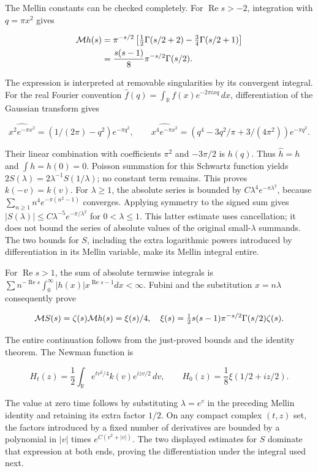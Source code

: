 The Mellin constants can be checked completely. For \(\operatorname{Re}s>-2\), integration with \(q=\pi x^2\) gives

\[
\begin{aligned}
{\cal M}h(s)
&=\pi^{-s/2}\left[\tfrac12\Gamma(s/2+2)-\tfrac34\Gamma(s/2+1)\right]\\
&=\frac{s(s-1)}8\pi^{-s/2}\Gamma(s/2).
\end{aligned}
\]

The expression is interpreted at removable singularities by its convergent integral. For the real Fourier convention \(\widehat f(q)=\int_{\mathbb R}f(x)e^{-2\pi ixq}\,dx\), differentiation of the Gaussian transform gives

\[
\widehat{x^2e^{-\pi x^2}}=(1/(2\pi)-q^2)e^{-\pi q^2},\qquad
\widehat{x^4e^{-\pi x^2}}=(q^4-3q^2/\pi+3/(4\pi^2))e^{-\pi q^2}.
\]

Their linear combination with coefficients \(\pi^2\) and \(-3\pi/2\) is \(h(q)\). Thus \(\widehat h=h\) and \(\int h=h(0)=0\). Poisson summation for this Schwartz function yields \(2S(\lambda)=2\lambda^{-1}S(1/\lambda)\); no constant term remains. This proves \(k(-v)=k(v)\). For \(\lambda\ge1\), the absolute series is bounded by \(C\lambda^4e^{-\pi\lambda^2}\), because \(\sum_{n\ge1}n^4e^{-\pi(n^2-1)}\) converges. Applying symmetry to the signed sum gives \(|S(\lambda)|\le C\lambda^{-5}e^{-\pi/\lambda^2}\) for \(0<\lambda\le1\). This latter estimate uses cancellation; it does not bound the series of absolute values of the original small-\(\lambda\) summands. The two bounds for \(S\), including the extra logarithmic powers introduced by differentiation in its Mellin variable, make its Mellin integral entire.

For \(\operatorname{Re}s>1\), the sum of absolute termwise integrals is \(\sum n^{-\operatorname{Re}s}\int_0^\infty |h(x)|x^{\operatorname{Re}s-1}dx<\infty\). Fubini and the substitution \(x=n\lambda\) consequently prove

\[
{\cal M}S(s)=\zeta(s){\cal M}h(s)=\xi(s)/4,
\quad\xi(s)=\tfrac12s(s-1)\pi^{-s/2}\Gamma(s/2)\zeta(s).
\]

The entire continuation follows from the just-proved bounds and the identity theorem. The Newman function is

\[
H_t(z)=\frac12\int_{\mathbb R}e^{tv^2/4}k(v)e^{izv/2}\,dv,
\qquad H_0(z)=\frac18\xi(1/2+iz/2).
\]

The value at zero time follows by substituting \(\lambda=e^v\) in the preceding Mellin identity and retaining its extra factor \(1/2\). On any compact complex \((t,z)\) set, the factors introduced by a fixed number of derivatives are bounded by a polynomial in \(|v|\) times \(e^{C(v^2+|v|)}\). The two displayed estimates for \(S\) dominate that expression at both ends, proving the differentiation under the integral used next.

